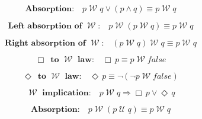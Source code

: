 \documentclass[12pt, fleqn, leqno]{article}
\newcommand{\impl}{\ensuremath{\Rightarrow}}        %
\newcommand{\Until}{\;\mathcal{U}\;}
\newcommand{\Wait}{\;\mathcal{W}\;}
\newcommand{\Event}{\Diamond\,}
\newcommand{\Always}{\Box\,}
\newcommand{\spacer}{\vspace{-30pt}}
\begin{document}
\spacer

\begin{equation}\label{E:waitOrAnd}
\textbf{Absorption:}\quad p\Wait q\lor (p\land q) \equiv p\Wait q
\end{equation}

\spacer

\begin{equation}\label{E:waitAbsL}
\textbf{Left absorption of $\Wait$:}\quad p \Wait (p \Wait q) \equiv p \Wait q
\end{equation}

\spacer

\begin{equation}\label{E:waitAbsR}
\textbf{Right absorption of $\Wait$:}\quad (p \Wait q) \Wait q \equiv p \Wait q
\end{equation}

\spacer

\begin{equation}\label{E:alwaysAsWait}
\textbf{$\Always$ to $\Wait$ law:}\quad \Always p \equiv p \Wait false
\end{equation}

\spacer

\begin{equation}\label{E:eventAsWait}
\textbf{$\Event$ to $\Wait$ law:}\quad \Event p \equiv \neg(\neg p \Wait false)
\end{equation}

\spacer

\begin{equation}\label{E:waitEntailment}
\textbf{$\Wait$ implication:}\quad p \Wait q \impl \Always p\lor \Event q
\end{equation}

\spacer

\begin{equation}\label{E:leftWaitAbsUtil}
\textbf{Absorption:}\quad p \Wait (p \Until q) \equiv p \Wait q
\end{equation}

\spacer
\end{document}
